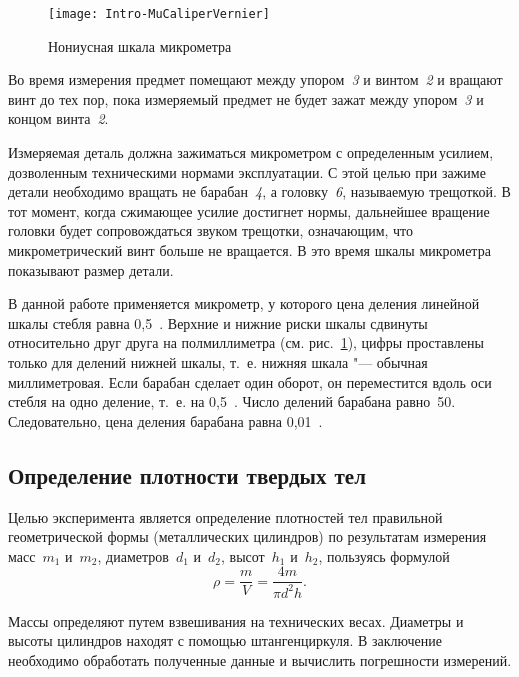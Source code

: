 \documentclass[a4paper, 12pt]{extarticle}
\begin{document}
\begin{figure}[h]
 \begin{center}
  \texttt{[image: Intro-MuCaliperVernier]}
  \caption{Нониусная шкала микрометра\label{fig:mzero-mu-caliper-vernier}}
 \end{center}
\end{figure}

Во время измерения предмет помещают между упором~\emph{3} и винтом~\emph{2} и вращают винт до тех пор, пока измеряемый предмет не будет зажат между упором~\emph{3} и концом винта~\emph{2}.

Измеряемая деталь должна зажиматься микрометром с определенным усилием, дозволенным техническими нормами эксплуатации. С этой целью при зажиме детали необходимо вращать не барабан~\emph{4}, а головку~\emph{6}, называемую трещоткой. В тот момент, когда сжимающее усилие достигнет  нормы, дальнейшее вращение головки будет сопровождаться звуком трещотки,  означающим, что микрометрический винт больше не вращается. В это время шкалы микрометра показывают размер детали.

В данной работе применяется микрометр, у которого цена деления линейной шкалы стебля равна 0,5~. Верхние и нижние риски шкалы сдвинуты относительно друг друга на полмиллиметра (см. рис.~\ref{fig:mzero-mu-caliper-vernier}), цифры проставлены только для делений нижней шкалы, т.~е. нижняя шкала "--- обычная миллиметровая. Если барабан сделает один оборот, он переместится вдоль оси стебля на одно деление, т.~е. на 0,5~. Число делений барабана равно~50. Следовательно, цена деления барабана равна 0,01~.




\subsection{Определение плотности твердых тел}

Целью эксперимента является определение плотностей тел правильной геометрической формы (металлических цилиндров) по результатам измерения масс~$m_1$ и~$m_2$, диаметров~$d_1$ и~$d_2$, высот~$h_1$ и~$h_2$, пользуясь формулой
\begin{equation}
\label{fig:mzero-density}
\rho = \frac{m}{V} = \frac{4m}{\pi d^2 h}.
\end{equation}

Массы определяют путем взвешивания на технических весах. Диаметры и высоты цилиндров находят с помощью штангенциркуля. В заключение необходимо обработать полученные данные и вычислить погрешности измерений.
\end{document}
